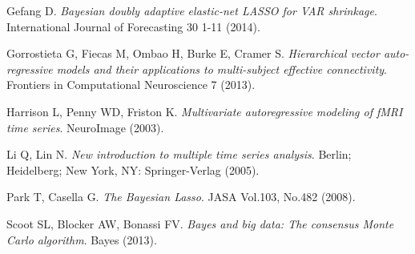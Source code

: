 \documentclass[12pt]{elsarticle}
\begin{document}
		\begin{thebibliography}{9}
			
			Gefang D.
			\textit{Bayesian doubly adaptive elastic-net LASSO for VAR shrinkage}. 
			International Journal of Forecasting 30 1-11 (2014).
			
			
			Gorrostieta G, Fiecas M, Ombao H, Burke E, Cramer S.
			\textit{Hierarchical vector auto-regressive models and their applications to multi-subject effective connectivity}. 
			Frontiers in Computational Neuroscience 7 (2013).
			
			
			Harrison L, Penny WD, Friston K.
			\textit{Multivariate autoregressive modeling of fMRI time series}. 
			NeuroImage (2003).
			
			
			
			Li Q, Lin N.
			\textit{New introduction to multiple time series analysis}. 
			Berlin; Heidelberg; New York, NY: Springer-Verlag (2005).
			
			
			Park T, Casella G.
			\textit{The Bayesian Lasso}. 
			JASA Vol.103, No.482 (2008).
			
			
			
			Scoot SL, Blocker AW, Bonassi FV.
			\textit{Bayes and big data: The consensus Monte Carlo algorithm}. 
			Bayes (2013).
			
			
		\end{thebibliography}
		
		
		
	
\end{document}
